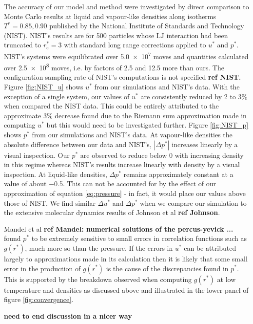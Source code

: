 \documentclass[10pt, twocolumn]{revtex4}    %
\begin{document}
The accuracy of our model and method were investigated by direct comparison to Monte Carlo results at liquid and vapour-like densities along isotherms $T^{*} = 0.85, 0.90$ published by the National Institute of Standards and Technology (NIST). NIST's results are for \num{500} particles whose LJ interaction had been truncated to $r_\text{c}^{*}=3$ with standard long range corrections applied to $u^{*}$ and $p^{*}$. NIST's systems were equilibrated over \num{5.0e7} moves and quantities calculated over \num{2.5e8} moves, i.e. by factors of \num{2.5} and \num{12.5} more than ours. The configuration sampling rate of NIST's computations is not specified \textbf{ref NIST}.
Figure \ref{fig:NIST_u} shows $u^{*}$ from our simulations and NIST's data. With the exception of a single system, our values of $u^{*}$ are consistently reduced by \num{2} to \num{3}\% when compared the NIST data. This could be entirely attributed to the approximate \num{3}\% decrease found due to the Riemann sum approximation made in computing $u^{*}$ but this would need to be investigated further.
Figure \ref{fig:NIST_p} shows $p^{*}$ from our simulations and NIST's data. At vapour-like densities the absolute difference between our data and NIST's, $|\Delta{}p^{*}|$ increases linearly by a visual inspection. Our $p^{*}$ are observed to reduce below \num{0} with increasing density in this regime whereas NIST's results increase linearly with density by a visual inspection. At liquid-like densities, $\Delta{}p^{*}$ remains approximately constant at a value of about \num{-0.5}. This can not be accounted for by the effect of our approximation of equation \ref{eq:pressure} - in fact, it would place our values above those of NIST.
We find similar $\Delta{}u^{*}$ and $\Delta{}p^{*}$ when we compare our simulation to the extensive molecular dynamics results of Johnson et al \textbf{ref Johnson}. 

Mandel et al \textbf{ref Mandel: numerical solutions of the percus-yevick ...} found $p^{*}$ to be extremely sensitive to small errors in correlation functions such as $g(r^{*})$, much more so than the pressure. If the errors in $u^{*}$ can be attributed largely to approximations made in its calculation then it is likely that some small error in the production of $g(r^{*})$ is the cause of the discrepancies found in $p^{*}$. This is supported by the breakdown observed when computing $g(r^{*})$ at low temperature and densities as discussed above and illustrated in the lower panel of figure \ref{fig:convergence}.

\textbf{need to end discussion in a nicer way}
\end{document}
